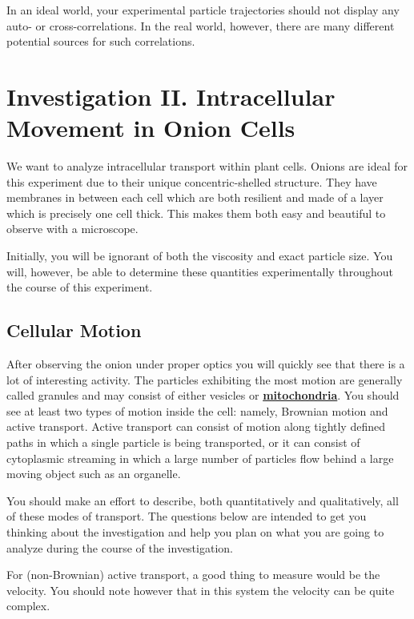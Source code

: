 \documentclass{../lab}
\begin{document}
In an ideal world, your experimental particle trajectories should not display any auto- or cross-correlations. In the real world, however, there are many different potential sources for such correlations.

\section{Investigation II. Intracellular Movement in Onion Cells}
\label{sec:InvestigationII}

We want to analyze intracellular transport within plant cells. Onions are ideal for this experiment due to their unique concentric-shelled structure. They have membranes in between each cell which are both resilient and made of a layer which is precisely one cell thick. This makes them both easy and beautiful to observe with a microscope.

Initially, you will be ignorant of both the viscosity and exact particle size. You will, however, be able to determine these quantities experimentally throughout the course of this experiment.

\subsection{Cellular Motion}

After observing the onion under proper optics you will quickly see that there is a lot of interesting activity. The particles exhibiting the most motion are generally called granules and may consist of either vesicles or \href{http://physics111.lib.berkeley.edu/Physics111/Reprints/OTZ/biowikipedia.pdf}{\textbf{mitochondria}}. You should see at least two types of motion inside the cell: namely, Brownian motion and active transport. Active transport can consist of motion along tightly defined paths in which a single particle is being transported, or it can consist of cytoplasmic streaming in which a large number of particles flow behind a large moving object such as an organelle.

You should make an effort to describe, both quantitatively and qualitatively, all of these modes of transport. The questions below are intended to get you thinking about the investigation and help you plan on what you are going to analyze during the course of the investigation.

For (non-Brownian) active transport, a good thing to measure would be the velocity. You should note however that in this system the velocity can be quite complex.
\end{document}
